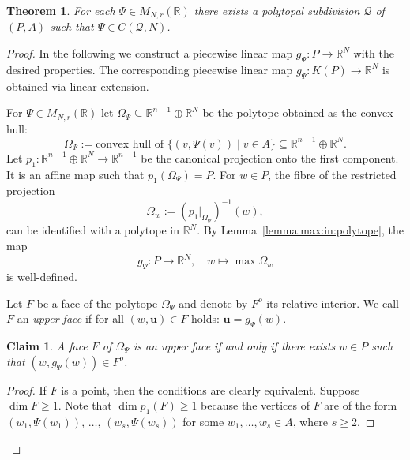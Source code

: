 \documentclass[10pt,a4paper]{amsart}
\newtheorem{theorem}{Theorem}
\newtheorem{claim}{Claim}
\newcommand{\MNaR}{M_{N,r}(\R)}
\newcommand{\R}{{\mathbb R}}
\newcommand{\mcQ}{{\mathcal Q}}
\begin{document}
\begin{theorem}\label{thm:gkz:complete}
For each $\Psi\in \MNaR$ there exists a polytopal subdivision $\mcQ$ of $(P,A)$ such that $\Psi\in C(\mcQ,N)$.
\end{theorem}

\begin{proof}
In the following we construct a piecewise linear map $g_\Psi:P\rightarrow \mathbb R^N$ with the desired properties. The corresponding piecewise linear map $g_\Psi:K(P)\rightarrow \mathbb R^N$ is obtained via linear extension.

For $\Psi\in M_{N,r}(\mathbb R)$ let $\Omega_\Psi\subseteq \mathbb R^{n-1}\oplus \mathbb R^N$ be the polytope obtained as the convex hull:
\begin{equation}\label{equation:Omega:Psi}
\Omega_\Psi:=\textrm{convex hull of\ }\{(  v,\Psi(  v))\mid   v\in A\}\subseteq \mathbb R^{n-1}\oplus \mathbb R^N.
\end{equation}
Let $p_1: \mathbb R^{n-1}\oplus \mathbb R^N\rightarrow \mathbb R^{n-1}$ be the canonical projection onto the first component. It is an affine map such that $p_1(\Omega_\Psi)=P$. For $w\in P$, the fibre of the restricted projection 
\begin{equation}\label{equation:fibre:Omega:w}
\Omega_{ {w}}:=(p_1\vert_{\Omega_\Psi})^{-1}(w) ,
\end{equation}
can be identified with a polytope in $\mathbb R^N$. By Lemma~\ref{lemma:max:in:polytope},  the map
\begin{equation}\label{definition:gPsi}
g_{\Psi}: P\rightarrow \mathbb R^N,\quad   w\mapsto \max \Omega_{ w}
\end{equation}
is well-defined.

Let $F$ be a face of the polytope $\Omega_\Psi$ and denote by $F^o$ its relative interior. We call $F$ an \emph{upper face} if for all $(w,\mathbf u)\in F$ holds: $\mathbf u=g_\Psi(  w)$. 

\begin{claim}
A face $F$ of $\Omega_\Psi$ is an upper face if and only if there exists $w\in P$ such that $(w,g_{\Psi}(w))\in F^o$.
\end{claim}

\begin{proof}
If $F$ is a point, then the conditions are clearly equivalent. Suppose $\dim F\ge 1$. Note that $\dim p_1(F)\ge 1$ because the vertices of $F$ are of the form $(w_1,\Psi(w_1))$, $\ldots$, $(w_s,\Psi(w_s))$ for some $w_1,\ldots, w_s\in A$, where $s\ge 2$.


\end{proof}
\end{proof}
\end{document}
